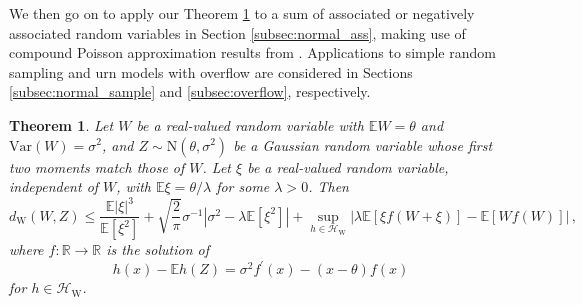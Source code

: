 \documentclass[12pt]{article}
\newtheorem{theorem}{Theorem}
\begin{document}
We then go on to apply our Theorem \ref{thm:Gauss} to a sum of associated or negatively associated random variables in Section \ref{subsec:normal_ass}, making use of compound Poisson approximation results from \cite{daly13}. Applications to simple random sampling and urn models with overflow are considered in Sections \ref{subsec:normal_sample} and \ref{subsec:overflow}, respectively.
\begin{theorem}\label{thm:Gauss}
Let $W$ be a real-valued random variable with $\mathbb{E}W=\theta$ and $\text{Var}(W)=\sigma^2$, and $Z\sim\text{N}(\theta,\sigma^2)$ be a Gaussian random variable whose first two moments match those of $W$. Let $\xi$ be a real-valued random variable, independent of $W$, with $\mathbb{E}\xi=\theta/\lambda$ for some $\lambda>0$. Then
\[
d_\text{W}(W,Z)\leq\frac{\mathbb{E}|\xi|^3}{\mathbb{E}[\xi^2]}+\sqrt{\frac{2}{\pi}}\sigma^{-1}|\sigma^2-\lambda\mathbb{E}[\xi^2]|+\sup_{h\in\mathcal{H}_{\text{W}}}\left|\lambda\mathbb{E}[\xi f(W+\xi)]-\mathbb{E}[Wf(W)]\right|\,,
\] 
where $f:\mathbb{R}\to\mathbb{R}$ is the solution of
\begin{equation}\label{eq:GaussStein}
h(x)-\mathbb{E}h(Z)=\sigma^2f^\prime(x)-(x-\theta)f(x)
\end{equation}
for $h\in\mathcal{H}_\text{W}$. 
\end{theorem} 
\end{document}
